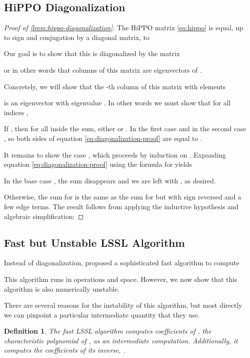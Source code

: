 \documentclass{article}
\newtheorem{definition}{Definition}
\begin{document}
\subsection{HiPPO Diagonalization}

\begin{proof}[Proof of \cref{lmm:hippo-diagonalization}]The HiPPO matrix \eqref{eq:hippo} is equal, up to sign and conjugation by a diagonal matrix, to
  
  Our goal is to show that this  is diagonalized by the matrix
  
  or in other words that columns of this matrix are eigenvectors of .

  Concretely, we will show that the -th column of this matrix  with elements
  
  is an eigenvector with eigenvalue .
  In other words we must show that for all indices ,
  

  If , then for all  inside the sum, either  or .
  In the first case  and in the second case ,
  so both sides of equation \eqref{eq:diagonalization-proof} are equal to .

  It remains to show the case , which proceeds by induction on .
  Expanding equation \eqref{eq:diagonalization-proof} using the formula for  yields
  

  In the base case , the sum disappears and we are left with , as desired.

  Otherwise, the sum for  is the same as the sum for  but with sign reversed and a few edge terms.
  The result follows from applying the inductive hypothesis and algebraic simplification:
  

\end{proof}

\subsection{Fast but Unstable LSSL Algorithm}

Instead of diagonalization,
\citet[Theorem 2]{gu2021lssl} proposed a sophisticated fast algorithm to compute

This algorithm runs in  operations and  space.
However, we now show that this algorithm is also numerically unstable.

There are several reasons for the instability of this algorithm, but most directly we can pinpoint a particular intermediate quantity that they use.
\begin{definition}The fast LSSL algorithm computes coefficients of , the characteristic polynomial of , as an intermediate computation.
  Additionally, it computes the coefficients of its inverse, .
\end{definition}
\end{document}
